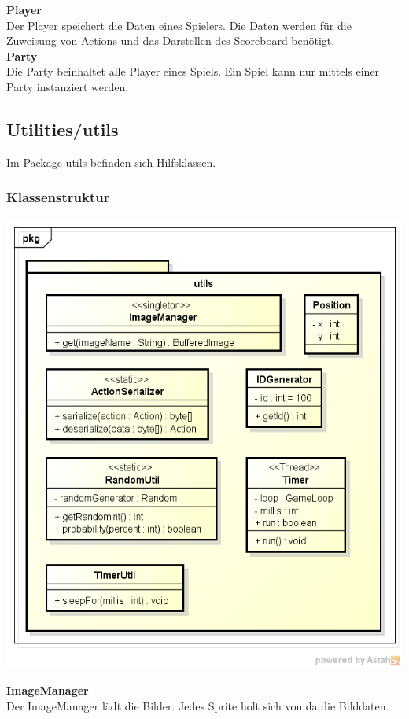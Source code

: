 \documentclass[11pt]{scrartcl}
\begin{document}
\textbf{Player}\\
Der Player speichert die Daten eines Spielers. Die Daten werden für die Zuweisung von Actions und das Darstellen des Scoreboard benötigt.\\

\textbf{Party}\\
Die Party beinhaltet alle Player eines Spiels. Ein Spiel kann nur mittels einer Party instanziert werden.

\newpage

\subsection{Utilities/utils}
Im Package utils befinden sich Hilfsklassen.
\subsubsection{Klassenstruktur}
\includegraphics[scale=0.75]{ClassDiagramUtils}

\textbf{ImageManager}\\
Der ImageManager lädt die Bilder. Jedes Sprite holt sich von da die Bilddaten.\\
\end{document}
